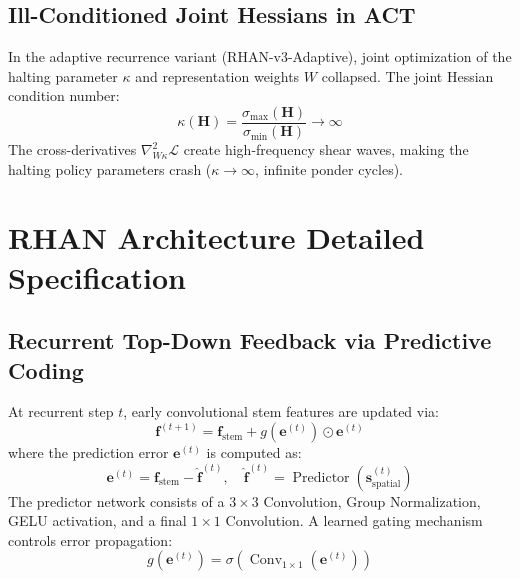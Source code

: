 \documentclass[12pt,a4paper]{article}
\begin{document}
\subsection{Ill-Conditioned Joint Hessians in ACT}

In the adaptive recurrence variant (RHAN-v3-Adaptive), joint optimization
of the halting parameter $\kappa$ and representation weights $W$ collapsed.
The joint Hessian condition number:
\begin{equation}
  \kappa(\mathbf{H}) = \frac{\sigma_{\max}(\mathbf{H})}
  {\sigma_{\min}(\mathbf{H})} \to \infty
\end{equation}
The cross-derivatives $\nabla^2_{W\kappa} \mathcal{L}$ create
high-frequency shear waves, making the halting policy parameters crash
($\kappa \to \infty$, infinite ponder cycles).


\section{RHAN Architecture Detailed Specification}
\label{app:arch}

\subsection{Recurrent Top-Down Feedback via Predictive Coding}

At recurrent step $t$, early convolutional stem features are updated via:
\begin{equation}
  \mathbf{f}^{(t+1)} = \mathbf{f}_{\mathrm{stem}} +
  g(\mathbf{e}^{(t)}) \odot \mathbf{e}^{(t)}
\end{equation}
where the prediction error $\mathbf{e}^{(t)}$ is computed as:
\begin{equation}
  \mathbf{e}^{(t)} = \mathbf{f}_{\mathrm{stem}} - \hat{\mathbf{f}}^{(t)},
  \quad \hat{\mathbf{f}}^{(t)} = \operatorname{Predictor}\left(
  \mathbf{s}_{\mathrm{spatial}}^{(t)}\right)
\end{equation}
The predictor network consists of a $3\times3$ Convolution, Group
Normalization, GELU activation, and a final $1\times1$ Convolution. A
learned gating mechanism controls error propagation:
\begin{equation}
  g(\mathbf{e}^{(t)}) = \sigma\left(
  \operatorname{Conv}_{1\times1}(\mathbf{e}^{(t)})\right)
\end{equation}
\end{document}
